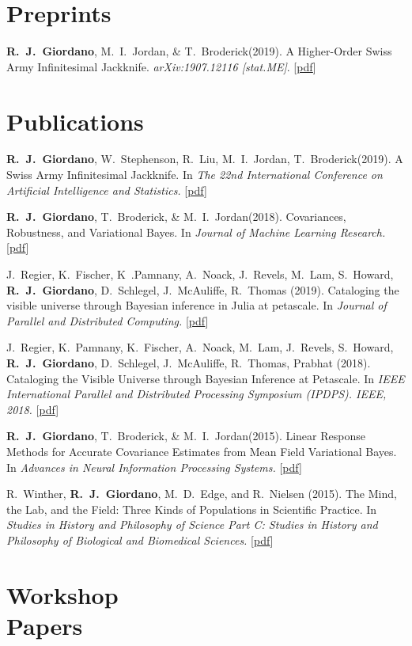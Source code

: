 \documentclass[margin,line]{res}
\newcommand{\me}{\textbf{R.~J.~Giordano}\xspace}
\newcommand{\tamara}{T.~Broderick\xspace}
\newcommand{\mike}{M.~I.~Jordan\xspace}
\newcommand{\runjing}{R.~Liu\xspace}
\newcommand{\paperref}[1]{[\href{#1}{pdf}]}
\newcommand{\paperref}[1]{}
\begin{document}
\begin{resume}
\section{\sc Preprints}

\me, \mike, \& \tamara (2019).
A Higher-Order Swiss Army Infinitesimal Jackknife.
\emph{arXiv:1907.12116 [stat.ME]}.
\paperref{https://arxiv.org/abs/1907.12116}

\section{\sc Publications}

\me, W.~Stephenson, \runjing, \mike, \tamara (2019).  A Swiss Army Infinitesimal
Jackknife. In \emph{The 22nd International Conference on Artificial Intelligence
and Statistics.}
\paperref{https://arxiv.org/abs/1806.00550}

\me, \tamara, \& \mike (2018).  Covariances, Robustness, and Variational Bayes.
In \emph{Journal of Machine Learning Research.}
\paperref{https://arxiv.org/abs/1709.02536}

J.~Regier, K.~Fischer, K~.Pamnany, A.~Noack, J.~Revels, M.~Lam, S.~Howard,
\me, D.~Schlegel, J.~McAuliffe, R.~Thomas (2019). Cataloging the visible
universe through Bayesian inference in Julia at petascale. In \emph{Journal of
Parallel and Distributed Computing.}
\paperref{https://doi.org/10.1016/j.jpdc.2018.12.008}

J.~Regier, K.~Pamnany, K.~Fischer, A.~Noack, M.~Lam, J.~Revels, S.~Howard, \me,
D.~Schlegel, J.~McAuliffe, R.~Thomas, Prabhat (2018).  Cataloging the Visible
Universe through Bayesian Inference at Petascale.  In \emph{IEEE International
Parallel and Distributed Processing Symposium (IPDPS). IEEE, 2018.}
\paperref{https://arxiv.org/abs/1801.10277}

\me, \tamara, \& \mike (2015). Linear Response Methods for Accurate Covariance
Estimates from Mean Field Variational Bayes. In \emph{Advances in Neural
Information Processing Systems.}
\paperref{https://arxiv.org/abs/1506.04088}

R.~Winther, \me, M.~D.~Edge, and R.~Nielsen (2015).  The Mind, the Lab, and the
Field: Three Kinds of Populations in Scientific Practice.  In \emph{Studies in
History and Philosophy of Science Part C: Studies in History and Philosophy of
Biological and Biomedical Sciences.}
\paperref{https://doi.org/10.1016/j.shpsc.2015.01.009}


\section{\sc Workshop \\ Papers}


\end{resume}
\end{document}
